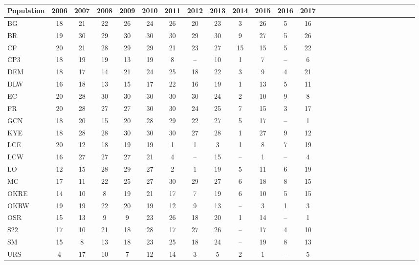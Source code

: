 \documentclass[12pt, oneside, titlepage]{article}   	%
\begin{document}
 \small
\setlength\tabcolsep{0pt} 


 \label{tab:sigma} 
\
\centering
\begin{tabular*}{\textwidth}{ l @{\extracolsep{\fill}} *{26}{c} }
  \hline
  \hline
  Population & 2006 & 2007 & 2008 & 2009 & 2010 & 2011 & 2012 & 2013 & 2014 & 2015 & 2016 & 2017 \\ 
  \hline
BG &  18 &  21 &  22 &  26 &  24 &  26 &  20 &  23 &   3 &  26 &   5 &  16 \\ 
  BR &  19 &  30 &  29 &  30 &  30 &  30 &  29 &  30 &   9 &  27 &   5 &  26 \\ 
  CF &  20 &  21 &  28 &  29 &  29 &  21 &  23 &  27 &  15 &  15 &   5 &  22 \\ 
  CP3 &  18 &  19 &  19 &  13 &  19 &   8 & -- &  10 &   1 &   7 & -- &   6 \\ 
  DEM &  18 &  17 &  14 &  21 &  24 &  25 &  18 &  22 &   3 &   9 &   4 &  21 \\ 
  DLW &  16 &  18 &  13 &  15 &  17 &  22 &  16 &  19 &   1 &  13 &   5 &  11 \\ 
  EC &  20 &  28 &  30 &  30 &  30 &  30 &  30 &  24 &   2 &  10 &   9 &   8 \\ 
  FR &  20 &  28 &  27 &  27 &  30 &  30 &  24 &  25 &   7 &  15 &   3 &  17 \\ 
  GCN &  18 &  20 &  15 &  20 &  28 &  29 &  22 &  27 &   5 &  17 & -- &   1 \\ 
  KYE &  18 &  28 &  28 &  30 &  30 &  30 &  27 &  28 &   1 &  27 &   9 &  12 \\ 
  LCE &  20 &  12 &  18 &  19 &  19 &   1 &   1 &   3 &   1 &   8 &   7 &  19 \\ 
  LCW &  16 &  27 &  27 &  27 &  21 &   4 & -- &  15 & -- &   1 & -- &   4 \\ 
  LO &  12 &  15 &  28 &  29 &  27 &   2 &   1 &  19 &   5 &  11 &   6 &  19 \\ 
  MC &  17 &  11 &  22 &  25 &  27 &  30 &  29 &  27 &   6 &  18 &   8 &  15 \\ 
  OKRE &  14 &  10 &   8 &  19 &  21 &  17 &   7 &  19 &   6 &  10 &   5 &  15 \\ 
  OKRW &  19 &  19 &  22 &  20 &  19 &  12 &   9 &  13 & -- &   3 &   1 &   3 \\ 
  OSR &  15 &  13 &   9 &   9 &  23 &  26 &  18 &  20 &   1 &  14 & -- &   1 \\ 
  S22 &  17 &  10 &  21 &  18 &  28 &  17 &  27 &  26 & -- &  17 &   4 &  10 \\ 
  SM &  15 &   8 &  13 &  18 &  23 &  25 &  18 &  24 & -- &  19 &   8 &  13 \\ 
  URS &   4 &  17 &  10 &   7 &  12 &  14 &   3 &   5 &   2 &   1 & -- &   5 \\ 
   \hline
\end{tabular*}
\end{document}
